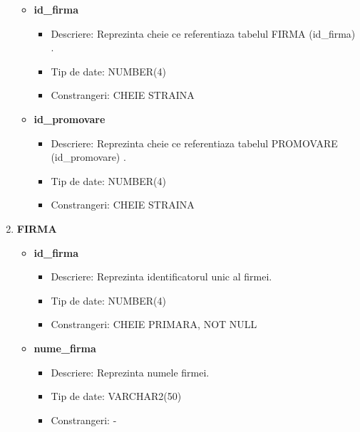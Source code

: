 \begin{enumerate}
\begin{itemize}
        \item \textbf{id\_firma}
                \begin{itemize}
                    \item Descriere: Reprezinta cheie ce referentiaza tabelul FIRMA (id\_firma) .
                    \item Tip de date: NUMBER(4)
                    \item Constrangeri: CHEIE STRAINA 
                \end{itemize}

        \item \textbf{id\_promovare}
                \begin{itemize}
                    \item Descriere: Reprezinta cheie ce referentiaza tabelul PROMOVARE (id\_promovare) .
                    \item Tip de date: NUMBER(4)
                    \item Constrangeri: CHEIE STRAINA 
                \end{itemize}
                
    \end{itemize}

    \vspace{0.5cm}

    \item \textbf{FIRMA}
    \begin{itemize}
    
        \item \textbf{id\_firma }
                \begin{itemize}
                    \item Descriere: Reprezinta identificatorul unic al firmei.
                    \item Tip de date: NUMBER(4)
                    \item Constrangeri: CHEIE PRIMARA, NOT NULL
                \end{itemize}
                
        \item \textbf{nume\_firma}
                \begin{itemize}
                    \item Descriere: Reprezinta numele firmei.
                    \item Tip de date: VARCHAR2(50)
                    \item Constrangeri: -
                \end{itemize}
                

\end{itemize}
\end{enumerate}
